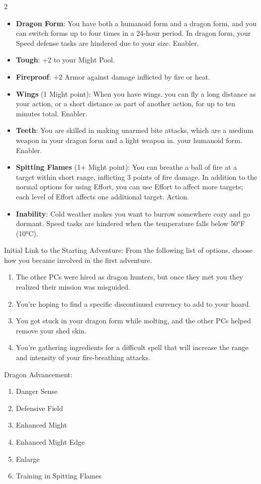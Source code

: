 \begin{multicols}{2}
\begin{itemize}
\item \textbf{Dragon Form}: You have both a humanoid form and a dragon form, and you can switch forms up to four times in a 24-hour period. In dragon form, your Speed defense tasks are hindered due to your size. Enabler.
\item \textbf{Tough}: +2 to your Might Pool.
\item \textbf{Fireproof}: +2 Armor against damage inflicted by fire or heat.
\item \textbf{Wings} (1 Might point): When you have wings, you can fly a long distance as your action, or a short distance as part of another action, for up to ten minutes total. Enabler.
\item \textbf{Teeth}: You are skilled in making unarmed bite attacks, which are a medium weapon in your dragon form and a light weapon in. your humanoid form. Enabler.
\item \textbf{Spitting Flames} (1+ Might point): You can breathe a ball of fire at a target within short range, inflicting 3 points of fire damage. In addition to the normal options for using Effort, you can use Effort to affect more targets; each level of Effort affects one additional target. Action.
\item \textbf{Inability}: Cold weather makes you want to burrow somewhere cozy and go dormant. Speed tasks are hindered when the temperature falls below 50°F (10°C).
\end{itemize}

Initial Link to the Starting Adventure: From the following list of options, choose how you became involved in the first adventure.
\begin{enumerate}
\item  The other PCs were hired as dragon hunters, but once they met you they realized their mission was misguided.
\item  You’re hoping to find a specific discontinued currency to add to your hoard.
\item  You got stuck in your dragon form while molting, and the other PCs helped remove your shed skin.
\item You’re gathering ingredients for a difficult spell that will increase the range and intensity of your fire-breathing attacks.
\end{enumerate}

Dragon Advancement:
\begin{enumerate}
\item Danger Sense 
\item Defensive Field 
\item Enhanced Might 
\item Enhanced Might Edge 
\item Enlarge
\item Training in Spitting Flames
\end{enumerate}


\end{multicols}
